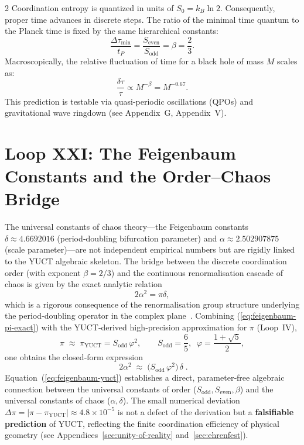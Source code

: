 \documentclass[12pt,a4paper]{article}
\begin{document}
\begin{multicols}{2}
		Coordination entropy is quantized in units of \(S_0 = k_B \ln 2\). Consequently, proper time advances in discrete steps. The ratio of the minimal time quantum to the Planck time is fixed by the same hierarchical constants:
		\begin{equation}
			\boxed{\frac{\Delta \tau_{\min}}{t_P} = \frac{S_{\mathrm{even}}}{S_{\mathrm{odd}}} = \beta = \frac{2}{3}}.
		\end{equation}
		Macroscopically, the relative fluctuation of time for a black hole of mass \(M\) scales as:
		\begin{equation}
			\frac{\delta \tau}{\tau} \propto M^{-\beta} = M^{-0.67}.
		\end{equation}
		This prediction is testable via quasi-periodic oscillations (QPOs) and gravitational wave ringdown (see Appendix~G, Appendix~V).
		
		\section{Loop XXI: The Feigenbaum Constants and the Order–Chaos Bridge}
		
		The universal constants of chaos theory---the Feigenbaum constants
		\(\delta \approx 4.6692016\) (period‑doubling bifurcation parameter) and
		\(\alpha \approx 2.502907875\) (scale parameter)---are not independent
		empirical numbers but are rigidly linked to the YUCT algebraic skeleton.
		The bridge between the discrete coordination order (with exponent \(\beta=2/3\)) and
		the continuous renormalisation cascade of chaos is given by the exact analytic
		relation
		\begin{equation}
			2\alpha^2 = \pi \delta,
			\label{eq:feigenbaum-pi-exact}
		\end{equation}
		which is a rigorous consequence of the renormalisation group structure
		underlying the period‑doubling operator in the complex plane~\cite{Feigenbaum1978}.
		Combining (\ref{eq:feigenbaum-pi-exact}) with the YUCT‑derived high‑precision
		approximation for \(\pi\) (Loop~IV),
		\begin{equation}
			\pi \;\approx\; \pi_{\mathrm{YUCT}} = S_{\mathrm{odd}}\,\varphi^2,
			\qquad
			S_{\mathrm{odd}} = \frac{6}{5},\;\; \varphi = \frac{1+\sqrt{5}}{2},
		\end{equation}
		one obtains the closed‑form expression
		\begin{equation}
			\boxed{\;
				2\alpha^2 \;\approx\; \bigl(S_{\mathrm{odd}}\,\varphi^2\bigr)\,\delta
				\;}.
			\label{eq:feigenbaum-yuct}
		\end{equation}
		Equation~(\ref{eq:feigenbaum-yuct}) establishes a direct, parameter‑free
		algebraic connection between the universal constants of order
		(\(S_{\mathrm{odd}}, S_{\mathrm{even}}, \beta\)) and the universal constants
		of chaos (\(\alpha, \delta\)).  The small numerical deviation
		\(\Delta\pi = |\pi - \pi_{\mathrm{YUCT}}| \approx 4.8\times10^{-5}\)
		is not a defect of the derivation but a \textbf{falsifiable prediction}
		of YUCT, reflecting the finite coordination efficiency of physical
		geometry (see Appendices~\ref{sec:unity-of-reality} and~\ref{sec:ehrenfest}).
		

\end{multicols}
\end{document}
